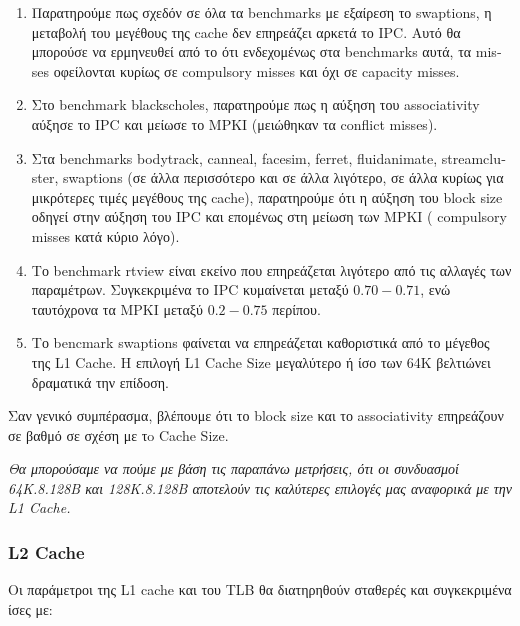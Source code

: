 \begin{enumerate}
    \item Παρατηρούμε πως σχεδόν σε όλα τα \textlatin{benchmarks} με εξαίρεση το
    \textlatin{swaptions}, η μεταβολή του μεγέθους της \textlatin{cache} δεν
    επηρεάζει αρκετά το \textlatin{IPC}. Αυτό θα μπορούσε να ερμηνευθεί από το
    ότι ενδεχομένως στα \textlatin{benchmarks} αυτά, τα \textlatin{misses}
    οφείλονται κυρίως σε \textlatin{compulsory misses} και όχι
    σε \textlatin{capacity misses}.
    
    \item Στο \textlatin{benchmark blackscholes}, παρατηρούμε πως η αύξηση του
    \textlatin{associativity} αύξησε το \textlatin{IPC} και μείωσε το
    \textlatin{MPKI} (μειώθηκαν τα \textlatin{conflict misses}).
    
    \item Στα \textlatin{benchmarks bodytrack, canneal, facesim, ferret,
    fluidanimate, streamcluster, swaptions} (σε άλλα περισσότερο και σε άλλα
    λιγότερο, σε άλλα κυρίως για μικρότερες τιμές μεγέθους της
    \textlatin{cache}), παρατηρούμε ότι η αύξηση του \textlatin{block size}
    οδηγεί στην αύξηση του \textlatin{IPC} και επομένως στη μείωση των
    \textlatin{MPKI} ( \textlatin{compulsory misses} κατά κύριο λόγο).
    
    \item Το \textlatin{benchmark rtview} είναι εκείνο που επηρεάζεται λιγότερο
    από τις αλλαγές των παραμέτρων. Συγκεκριμένα το \textlatin{IPC} κυμαίνεται
    μεταξύ $0.70-0.71$, ενώ ταυτόχρονα τα \textlatin{MPKI} μεταξύ $0.2-0.75$
    περίπου. 

    \item Το bencmark swaptions φαίνεται να επηρεάζεται καθοριστικά από το
    μέγεθος της L1 Cache. Η επιλογή L1 Cache Size μεγαλύτερο ή ίσο των 64Κ
    βελτιώνει δραματικά την επίδοση.
\end{enumerate}

Σαν γενικό συμπέρασμα, βλέπουμε ότι το \textlatin{block size} και το associativity επηρεάζουν σε
βαθμό σε σχέση με τo Cache Size.
\vspace{1cm}

\textit{Θα μπορούσαμε να πούμε με βάση τις παραπάνω μετρήσεις, ότι οι συνδυασμοί 64Κ.8.128Β και 128Κ.8.128B αποτελούν τις καλύτερες επιλογές μας αναφορικά με την \textlatin{L1 Cache}.}

\newpage
\subsubsection{L2 Cache}
Οι παράμετροι της \textlatin{L1 cache} και του \textlatin{TLB} θα διατηρηθούν
σταθερές και συγκεκριμένα ίσες με:

